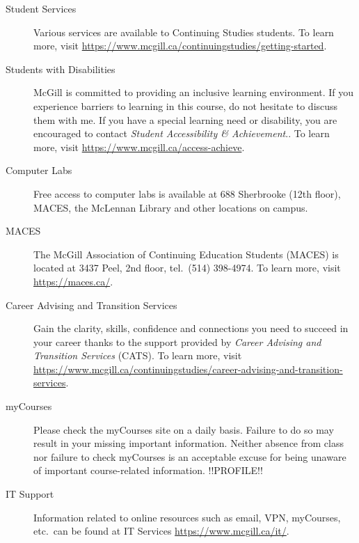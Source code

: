 \documentclass{article}
\begin{document}
\begin{description}
\item[Student Services]{Various services are available to Continuing
  Studies students. To learn more, visit \url{https://www.mcgill.ca/continuingstudies/getting-started}.}
\item[Students with Disabilities]{McGill is committed to providing an
  inclusive learning environment. If you experience barriers to
  learning in this course, do not hesitate to discuss them with me. If
  you have a special learning need or disability, you are encouraged
  to contact {\em Student Accessibility \& Achievement}.. To learn more,
  visit \url{https://www.mcgill.ca/access-achieve}.}
 \item[Computer Labs]{Free access to computer labs is available at 688
   Sherbrooke (12th floor), MACES, the McLennan Library and other
   locations on campus.}
 \item[MACES]{The McGill Association of Continuing Education Students
   (MACES) is located at 3437 Peel, 2nd floor, tel.\ (514) 398-4974. To
   learn more, visit \url{https://maces.ca/}.}
\item[Career Advising and Transition Services]{Gain the clarity,
  skills, confidence and connections you need to succeed in your
  career thanks to the support provided by {\em Career Advising and
    Transition Services} (CATS). To learn more, visit
  \url{https://www.mcgill.ca/continuingstudies/career-advising-and-transition-services}.}
\item[myCourses]{Please check the myCourses site on a daily
  basis. Failure to do so may result in your missing important
  information. Neither absence from class nor failure to check
  myCourses is an acceptable excuse for being unaware of important
  course-related information.}
!!PROFILE!!
\item[IT Support]{Information related to online resources such as
  email, VPN, myCourses, etc.\ can be found at IT Services
  \url{https://www.mcgill.ca/it/}.}
\end{description}

\label{LastPage}
\end{document}
